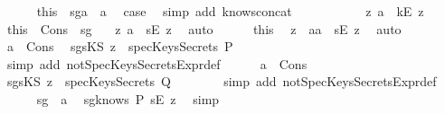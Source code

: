 \begin{isabellebody}
\ \ \ \ \isamarkupfalse%
\ this\ \ sg{}a\ \ a{}\ \isamarkupfalse%
\ {\isacharquery}case\ \isamarkupfalse%
\ {\isacharparenleft}simp\ add{\isacharcolon}\ knows{\isacharunderscore}concat{\isacharunderscore}{}{\isacharparenright}\isanewline
\ \ \isamarkupfalse%
\ \isanewline
\ \ \ \ \isamarkupfalse%
\ {\isachardoublequoteopen}{\isasymnot}\ {\isacharparenleft}{\isasymexists}z{}{\isachardot}\ a\ {\isacharequal}\ kE\ z{}{\isacharparenright}{\isachardoublequoteclose}\isanewline
\ \ \ \ \isamarkupfalse%
\ this\ \ Cons\ \ sg{}\ \isamarkupfalse%
\ {\isachardoublequoteopen}{\isasymexists}\ z{}{\isachardot}\ a\ {\isacharequal}\ {\isacharparenleft}sE\ z{}{\isacharparenright}{\isachardoublequoteclose}\ \isamarkupfalse%
\ auto\isanewline
\ \ \ \ \isamarkupfalse%
\ this\ \isamarkupfalse%
\ z\ \ a{}{\isacharcolon}{\isachardoublequoteopen}a\ {\isacharequal}\ {\isacharparenleft}sE\ z{\isacharparenright}{\isachardoublequoteclose}\ \isamarkupfalse%
\ auto\isanewline
\ \ \ \ \isamarkupfalse%
\ a{}\ \ Cons\ \isamarkupfalse%
\ sg{}{\isacharcolon}{\isachardoublequoteopen}{\isacharparenleft}sKS\ z{\isacharparenright}\ {\isasymnotin}\ specKeysSecrets\ P{\isachardoublequoteclose}\ \isanewline
\ \ \ \ \ \ \isamarkupfalse%
\ {\isacharparenleft}simp\ add{\isacharcolon}\ notSpecKeysSecretsExpr{\isacharunderscore}def{\isacharparenright}\isanewline
\ \ \ \ \isamarkupfalse%
\ a{}\ \ Cons\ \isamarkupfalse%
\ sg{}{\isacharcolon}{\isachardoublequoteopen}{\isacharparenleft}sKS\ z{\isacharparenright}\ {\isasymnotin}\ specKeysSecrets\ Q{\isachardoublequoteclose}\isanewline
\ \ \ \ \ \ \isamarkupfalse%
\ {\isacharparenleft}simp\ add{\isacharcolon}\ notSpecKeysSecretsExpr{\isacharunderscore}def{\isacharparenright}\isanewline
\ \ \ \ \isamarkupfalse%
\ sg{}\ \ a{}\ \isamarkupfalse%
\ sg{}{}{\isacharcolon}{\isachardoublequoteopen}knows\ P\ {\isacharbrackleft}sE\ z{\isacharbrackright}{\isachardoublequoteclose}\ \isamarkupfalse%
\ simp\ \isanewline

\end{isabellebody}
